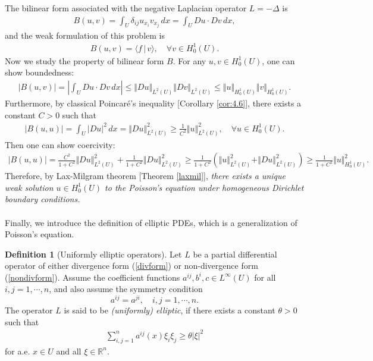 \documentclass{article}
\numberwithin{equation}{section}
\newcommand{\bbR}{\mathbb{R}}
\theoremstyle{plain}
\theoremstyle{definition}
\newtheorem{definition}[theorem]{Definition}
\begin{document}
The bilinear form associated with the negative Laplacian operator $L=-\Delta$ is
\begin{align*}
	B(u,v)=\int_U\delta_{ij}u_{x_i}v_{x_j}\,dx=\int_U Du\cdot Dv\,dx, 
\end{align*}
and the weak formulation of this problem is
\begin{align*}
	B(u,v)=\langle f\,|\,v\rangle,\quad\forall v\in H_0^1(U).
\end{align*}
Now we study the property of bilinear form $B$. For any $u,v\in H_0^1(U)$, one can show boundedness:
\begin{align*}
	\vert B(u,v)\vert=\left\vert\int_U Du\cdot Dv\,dx\right\vert\leq\Vert Du\Vert_{L^2(U)}\Vert Dv\Vert_{L^2(U)}\leq\Vert u\Vert_{H_0^1(U)}\Vert v\Vert_{H_0^1(U)}.
\end{align*}
Furthermore, by classical Poincaré's inequality [Corollary \ref{cor:4.6}], there exists a constant $C>0$ such that
\begin{align*}
	\vert B(u,u)\vert=\int_U\vert Du\vert^2\,dx=\Vert Du\Vert_{L^2(U)}^2\geq\frac{1}{C^2}\Vert u\Vert_{L^2(U)}^2,\quad\forall u\in H_0^1(U).
\end{align*}
Then one can show coercivity:
\begin{align*}
	\vert B(u,u)\vert=\frac{C^2}{1+C^2}\Vert Du\Vert_{L^2(U)}^2+\frac{1}{1+C^2}\Vert Du\Vert_{L^2(U)}^2\geq\frac{1}{1+C^2}\left(\Vert u\Vert_{L^2(U)}^2+\Vert Du\Vert_{L^2(U)}^2\right)\geq\frac{1}{1+C^2}\Vert u\Vert_{H_0^1(U)}^2.
\end{align*}
Therefore, by Lax-Milgram theorem [Theorem \ref{laxmil}], \textit{there exists a unique weak solution $u\in H_0^1(U)$ to the Poisson's equation under homogeneous Dirichlet boundary conditions.}

\paragraph{} Finally, we introduce the definition of elliptic PDEs, which is a generalization of Poisson's equation. 

\begin{definition}[Uniformly elliptic operators]
Let $L$ be a partial differential operator of either divergence form (\ref{divform}) or non-divergence form (\ref{nondivform}). Assume the coefficient functions $a^{ij},b^i,c\in L^\infty(U)$ for all $i,j=1,\cdots,n$, and also assume the symmetry condition $$a^{ij}=a^{ji},\quad i,j=1,\cdots,n.$$ 
The operator $L$ is said to be \textit{(uniformly) elliptic}, if there exists a constant $\theta>0$ such that
\begin{align*}
	\sum_{i,j=1}^n a^{ij}(x)\xi_i\xi_j\geq\theta\vert\xi\vert^2
\end{align*}
for a.e. $x\in U$ and all $\xi\in\bbR^n$.
\end{definition}
\end{document}

